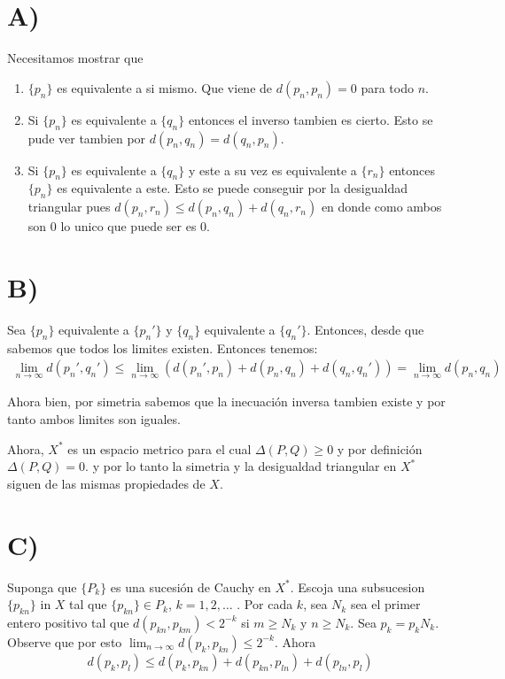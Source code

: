 \documentclass[12pt]{article}
\newenvironment{sol}[1][Solución]{\begin{trivlist}
\item[\hskip \labelsep {\bfseries #1:}]}{\end{trivlist}}
\begin{document}
\begin{sol}
  \section*{A)}

  Necesitamos mostrar que 
  \begin{enumerate}
    \item $\{p_n\}$ es equivalente a si mismo. Que viene de $d(p_n, p_n) = 0$ para todo $n$.
    \item Si $\{p_n\}$ es equivalente a $\{q_n\}$ entonces el inverso tambien es cierto. Esto se pude ver tambien por $d(p_n, q_n) = d(q_n, p_n)$.
    \item Si $\{p_n\}$ es equivalente a $\{q_n\}$  y este a su vez es equivalente a $\{r_n\}$ entonces $\{p_n\}$ es equivalente a este. Esto se puede conseguir por la desigualdad triangular pues $d(p_n, r_n) \le d(p_n, q_n) + d(q_n, r_n)$ en donde como ambos son 0 lo unico que puede ser es $0$.
  \end{enumerate}
  
  \section*{B)}

  Sea $\{p_n\}$ equivalente a $\{p_n'\}$ y $\{q_n\}$ equivalente a $\{q_n'\}$. Entonces, desde que sabemos que todos los limites existen. Entonces tenemos:
  \begin{align*}
    \displaystyle\lim_{n\to\infty} d(p_n',q_n') \le \displaystyle\lim_{n\to\infty} (d(p_n',p_n) + d(p_n, q_n) + d(q_n, q_n')) = \displaystyle\lim_{n\to\infty}d(p_n, q_n)
  \end{align*}

  Ahora bien, por simetria sabemos que la inecuación inversa tambien existe y por tanto ambos limites son iguales.

  Ahora, $X^*$  es un espacio metrico para el cual $\Delta(P,Q) \ge 0$ y por definición $\Delta(P, Q) = 0$. y por lo tanto la simetria y la desigualdad triangular en $X^*$ siguen de las mismas propiedades de $X$.

  \section*{C)}

  Suponga que $\{P_k\}$ es una sucesión de Cauchy en $X^*$. Escoja una subsucesion $\{p_{kn}\}$ in $X$ tal que $\{p_{kn}\}\in P_k$, $k=1,2,\ldots$ . Por cada $k$, sea $N_k$ sea el primer entero positivo tal que $d(p_{kn}, p_{km}) < 2^{-k}$ si $m \ge N_k$ y $n \ge N_k$. Sea $p_k = p_kN_k$. Observe que por esto $\displaystyle\lim_{n\to\infty} d(p_k, p_{kn}) \le 2^{-k}$. Ahora \[
    d(p_k, p_l) \le d(p_k, p_{kn}) + d(p_{kn}, p_{ln}) + d(p_{ln}, p_l)
  \]


\end{sol}
\end{document}
